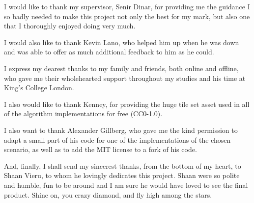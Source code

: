 
I would like to thank my supervisor, Senir Dinar, for providing me the guidance I so badly needed to make this project not only the best for my mark, but also one that I thoroughly enjoyed doing very much.

I would also like to thank Kevin Lano, who helped him up when he was down and was able to offer as much additional feedback to him as he could.

I express my dearest thanks to my family and friends, both online and offline, who gave me their wholehearted support throughout my studies and his time at King's College London.

I also would like to thank Kenney, for providing the huge tile set asset used in all of the algorithm implementations for free (CC0-1.0).

I also want to thank Alexander Gillberg, who gave me the kind permission to adapt a small part of his code for one of the implementations of the chosen scenario, as well as to add the MIT license to a fork of his code.

And, finally, I shall send my sincerest thanks, from the bottom of my heart, to Shaan Vieru, to whom he lovingly dedicates this project. Shaan were so polite and humble, fun to be around and I am sure he would have loved to see the final product. Shine on, you crazy diamond, and fly high among the stars.